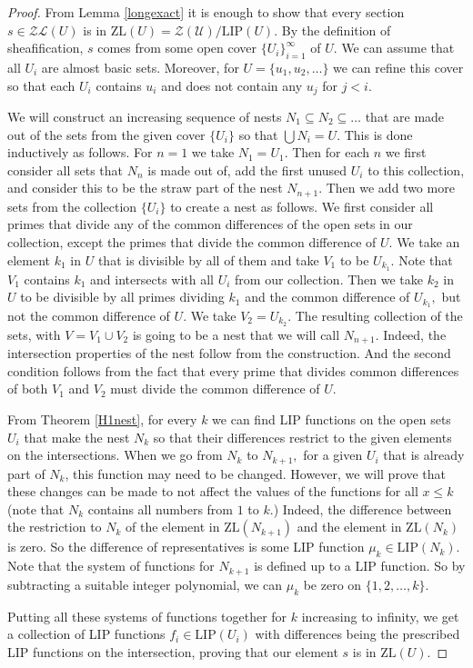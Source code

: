 \documentclass[10pt]{article}
\theoremstyle{definition}
\begin{document}
\begin{proof} From Lemma \ref{longexact} it is enough to show that every section $s\in \mathcal{ZL}(U)$ is in $\textrm{ZL}(U)=\mathcal{Z(U)}/\textrm{LIP}(U).$ By the definition of sheafification, $s$ comes from some open cover $\{U_i\}_{i=1}^{\infty}$ of $U$. We can assume that all $U_i$ are almost basic sets. Moreover, for $U=\{u_1,u_2 ,\dots\}$ we can refine this cover so that each $U_i$ contains $u_i$ and does not contain any $u_j$ for $j<i.$ 

We will construct an increasing sequence of nests $N_1\subseteq N_2\subseteq \dots$ that are made out of the sets from the given cover $\{U_i\}$  so that $\bigcup N_i=U$. This is done inductively as follows. For $n=1$ we take $N_1=U_1.$ Then for each $n$ we first consider all sets that $N_n$ is made out of, add the first unused $U_i$ to this collection, and consider this to be the straw part of the nest $N_{n+1}$. Then we add two more sets from the collection $\{U_i\}$ to create a nest as follows. We first consider all primes that divide any of the common differences of the open sets in our collection, except the primes that divide the common difference of $U$. We take an element $k_1$ in $U$ that is divisible by all of them and take $V_1$ to be $U_{k_1}.$ Note that $V_1$ contains $k_1$ and  intersects with all $U_i$ from our collection. Then we take $k_2$ in $U$ to be divisible by all primes dividing $k_1$ and the common difference of $U_{k_1},$ but not the common difference of $U.$ We take $V_2=U_{k_2}.$ The resulting collection of the sets, with $V=V_1\cup V_2$ is going to be a nest that we will call $N_{n+1}$. Indeed, the intersection properties of the nest follow from the construction. And the second condition follows from the fact that every prime that divides common differences of both $V_1$ and $V_2$ must divide the common difference of $U$.

From Theorem \ref{H1nest}, for every $k$ we can find LIP functions on the open sets $U_i$ that make the nest $N_k$ so that their differences restrict to the given elements on the intersections. When we go from $N_k$ to $N_{k+1},$ for a given $U_i$ that is already part of $N_k$, this function may need to be changed. However, we will prove that these changes can be made to not affect the values of the functions for all $x\leq k$ (note that $N_k$ contains all numbers from $1$ to $k$.) Indeed, the difference between the restriction to $N_k$ of the element in $\textrm{ZL}(N_{k+1})$ and the element in $\textrm{ZL}(N_k)$ is zero. So the difference of representatives is some LIP function $\mu_k\in \textrm{LIP}(N_k)$. Note that the system of functions for $N_{k+1}$ is defined up to a LIP function. So by subtracting a suitable integer polynomial, we can $\mu_k$ be zero on $\{1,2,\ldots, k\}.$

Putting all these systems of functions together for $k$ increasing to infinity, we get a collection of LIP functions $f_i\in \textrm{LIP}(U_i)$ with differences being the prescribed LIP functions on the intersection, proving that our element $s$ is in $\textrm{ZL}(U)$.
\end{proof}
\end{document}
